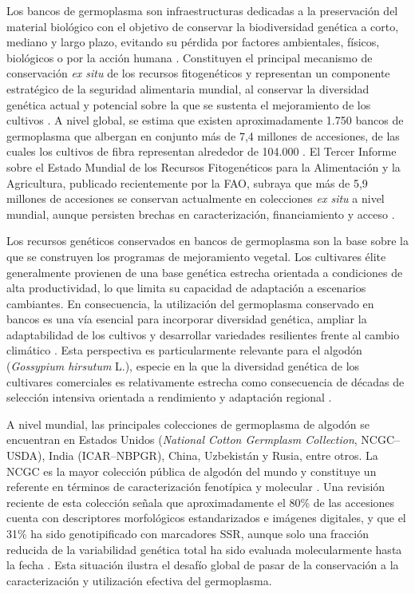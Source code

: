 \documentclass[12pt,oneside]{reedthesis}
\begin{document}
Los bancos de germoplasma son infraestructuras dedicadas a la preservación del material biológico con el objetivo de conservar la biodiversidad genética a corto, mediano y largo plazo, evitando su pérdida por factores ambientales, físicos, biológicos o por la acción humana \autocite{ruiz2024}. Constituyen el principal mecanismo de conservación \emph{ex situ} de los recursos fitogenéticos y representan un componente estratégico de la seguridad alimentaria mundial, al conservar la diversidad genética actual y potencial sobre la que se sustenta el mejoramiento de los cultivos \autocite{engels2024,fao2025a}. A nivel global, se estima que existen aproximadamente 1.750 bancos de germoplasma que albergan en conjunto más de 7,4 millones de accesiones, de las cuales los cultivos de fibra representan alrededor de 104.000 \autocite{egan2022}. El Tercer Informe sobre el Estado Mundial de los Recursos Fitogenéticos para la Alimentación y la Agricultura, publicado recientemente por la FAO, subraya que más de 5,9 millones de accesiones se conservan actualmente en colecciones \emph{ex situ} a nivel mundial, aunque persisten brechas en caracterización, financiamiento y acceso \autocite{fao2025a}.

Los recursos genéticos conservados en bancos de germoplasma son la base sobre la que se construyen los programas de mejoramiento vegetal. Los cultivares élite generalmente provienen de una base genética estrecha orientada a condiciones de alta productividad, lo que limita su capacidad de adaptación a escenarios cambiantes. En consecuencia, la utilización del germoplasma conservado en bancos es una vía esencial para incorporar diversidad genética, ampliar la adaptabilidad de los cultivos y desarrollar variedades resilientes frente al cambio climático \autocite{egan2022,volk2023}. Esta perspectiva es particularmente relevante para el algodón (\emph{Gossypium hirsutum} L.), especie en la que la diversidad genética de los cultivares comerciales es relativamente estrecha como consecuencia de décadas de selección intensiva orientada a rendimiento y adaptación regional \autocite{li2023}.

A nivel mundial, las principales colecciones de germoplasma de algodón se encuentran en Estados Unidos (\emph{National Cotton Germplasm Collection}, NCGC--USDA), India (ICAR--NBPGR), China, Uzbekistán y Rusia, entre otros. La NCGC es la mayor colección pública de algodón del mundo y constituye un referente en términos de caracterización fenotípica y molecular \autocite{hinze2025}. Una revisión reciente de esta colección señala que aproximadamente el 80\% de las accesiones cuenta con descriptores morfológicos estandarizados e imágenes digitales, y que el 31\% ha sido genotipificado con marcadores SSR, aunque solo una fracción reducida de la variabilidad genética total ha sido evaluada molecularmente hasta la fecha \autocite{hinze2025}. Esta situación ilustra el desafío global de pasar de la conservación a la caracterización y utilización efectiva del germoplasma.
\end{document}
